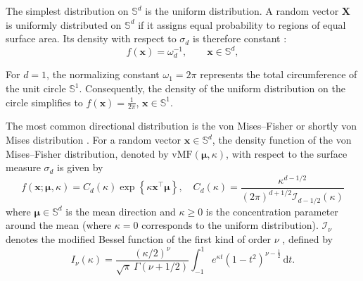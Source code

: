 \documentclass[12pt]{report} %
\newcommand{\bx}{\mathbf{x}}
\newcommand{\bmu}{\boldsymbol{\mu}}
\newcommand{\sigmad}{\sigma_{d}}
\newcommand{\rd}{\mathrm{d}}
\newcommand{\Sd}{\mathbb{S}^{d}}
\begin{document}
 



The simplest distribution on $\Sd$ is the uniform distribution. A random vector $\mathbf X$ is uniformly distributed on $\Sd$ if it assigns equal probability to regions of equal surface area. Its density with respect to $\sigmad$ is therefore constant \citep{Ley2017a}: 
\begin{equation}
\label{eq:sph-uniform}
f(\bx)=\omega_d^{-1}, \qquad \bx\in\mathbb{S}^d,
\end{equation}

For $d=1$, the normalizing constant $\omega_1 = 2\pi$ represents the total circumference of the unit circle $\mathbb{S}^1$. Consequently, the density of the uniform distribution on the circle simplifies to $f(\bx) = \frac{1}{2\pi}$, $\bx \in \mathbb{S}^1$. 

The most common directional distribution is the von Mises--Fisher or shortly von Mises distribution \citep[see][]{Watson1983, Mardia1999a}. For a random vector $\bx \in \Sd$, the density function of the von Mises--Fisher distribution, denoted by $\mathrm{vMF}(\bmu,\kappa)$, with respect to the surface measure $\sigmad$ is given by 
\begin{equation}
    \label{eq:vonMisesFisher}
    f(\bx; \bmu, \kappa) = C_{d}(\kappa)\exp\left\{ \kappa \bx^\top\bmu \right\}, \quad C_{d}(\kappa) = \frac{\kappa^{{d-1}/{2}}}{(2\pi)^{{d+1}/{2}} \mathcal{I}_{{d-1}{/2}}(\kappa)}
\end{equation}
where $\bmu \in \Sd$ is the mean direction and $\kappa \geq 0$ is the concentration parameter around the mean (where $\kappa = 0$ corresponds to the uniform distribution). $\mathcal{I}_{\nu}$ denotes the modified Bessel function of the first kind of order $\nu$ \citep[see][]{NIST:DLMF},
defined by 
\begin{equation*}
    I_{\nu}(\kappa) =
    \frac{(\kappa/2)^{\nu}}
    {\sqrt{\pi}\,\Gamma\!\left(\nu+1/2\right)}
    \int_{-1}^{1}
    e^{\kappa t}
    \left(1-t^{2}\right)^{\nu-\frac{1}{2}}
    \,\rd t.
\end{equation*}
\end{document}
